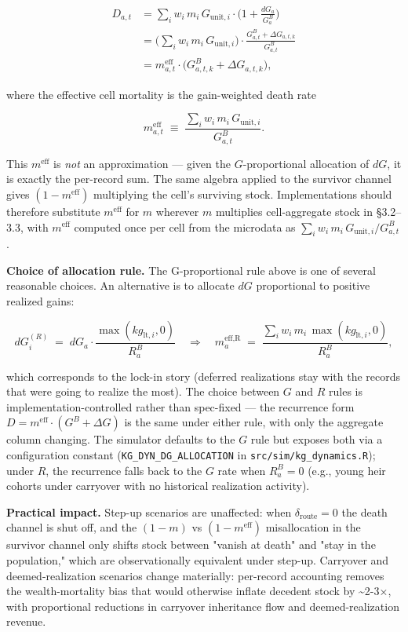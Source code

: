\documentclass[11pt]{article}
\begin{document}
\[
\begin{aligned}
D_{a,t}
&= \sum_i w_i\, m_i\, G_{\text{unit},i}\cdot\Big(1 + \tfrac{dG_a}{G^B_a}\Big) \\
&= \Big(\sum_i w_i\, m_i\, G_{\text{unit},i}\Big) \cdot \frac{G^B_{a,t} + \Delta G_{a,t,k}}{G^B_{a,t}} \\
&= m^{\text{eff}}_{a,t}\cdot\big(G^B_{a,t,k} + \Delta G_{a,t,k}\big),
\end{aligned}
\]

where the effective cell mortality is the gain-weighted death rate

\[
m^{\text{eff}}_{a,t} \;\equiv\; \frac{\sum_i w_i\, m_i\, G_{\text{unit},i}}{G^B_{a,t}}.
\]

This $m^{\text{eff}}$ is \emph{not} an approximation — given the $G$-proportional allocation of $dG$, it is exactly the per-record sum. The same algebra applied to the survivor channel gives $(1 - m^{\text{eff}})$ multiplying the cell's surviving stock. Implementations should therefore substitute $m^{\text{eff}}$ for $m$ wherever $m$ multiplies cell-aggregate stock in §3.2–3.3, with $m^{\text{eff}}$ computed once per cell from the microdata as $\sum_i w_i\, m_i\, G_{\text{unit},i} / G^B_{a,t}$.

\textbf{Choice of allocation rule.} The G-proportional rule above is one of several reasonable choices. An alternative is to allocate $dG$ proportional to positive realized gains:

\[
dG_i^{(R)} \;=\; dG_a \cdot \frac{\max(kg_{\text{lt},i}, 0)}{R^B_a}
\quad\Rightarrow\quad
m^{\text{eff,R}}_a \;=\; \frac{\sum_i w_i\, m_i\, \max(kg_{\text{lt},i}, 0)}{R^B_a},
\]

which corresponds to the lock-in story (deferred realizations stay with the records that were going to realize the most). The choice between $G$ and $R$ rules is implementation-controlled rather than spec-fixed — the recurrence form $D = m^{\text{eff}}\cdot(G^B + \Delta G)$ is the same under either rule, with only the aggregate column changing. The simulator defaults to the $G$ rule but exposes both via a configuration constant (\texttt{KG\_DYN\_DG\_ALLOCATION} in \texttt{src/sim/kg\_dynamics.R}); under $R$, the recurrence falls back to the $G$ rate when $R^B_a = 0$ (e.g., young heir cohorts under carryover with no historical realization activity).

\textbf{Practical impact.} Step-up scenarios are unaffected: when $\delta_\text{route}=0$ the death channel is shut off, and the $(1-m)$ vs $(1-m^\text{eff})$ misallocation in the survivor channel only shifts stock between "vanish at death" and "stay in the population," which are observationally equivalent under step-up. Carryover and deemed-realization scenarios change materially: per-record accounting removes the wealth-mortality bias that would otherwise inflate decedent stock by \textasciitilde{}2-3×, with proportional reductions in carryover inheritance flow and deemed-realization revenue.
\end{document}
